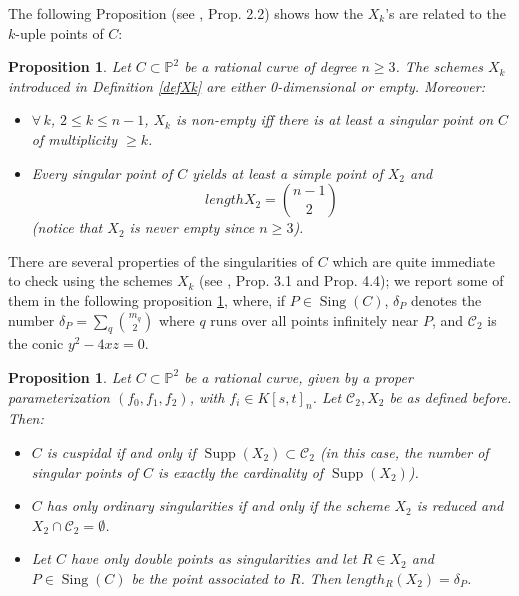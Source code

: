 \documentclass[draft]{amsart}
\newtheorem{prop}[thm]{Proposition}
\theoremstyle{definition}
\theoremstyle{remark}
\theoremstyle{definition}
\DeclareMathOperator{\Supp}{Supp}
\DeclareMathOperator{\Sing}{Sing}
\newcommand{\PP}{\mathbb{P}}
\def\a{\bigskip \par \noindent}
\def\b{\par \noindent}
\begin{document}
\a The following Proposition (see \cite{BGI}, Prop. 2.2) shows how the $X_k$'s are related to the $k$-uple points of $C$:

\begin{prop}\label{Singpoint}
Let $C\subset \PP^2$ be a rational curve of degree $n\geq 3$. The schemes $X_k$ introduced in Definition \ref{defXk} are either 0-dimensional or empty. Moreover:
\begin{itemize}
\item $\forall \, k$, $2\leq k\leq n-1$, $X_k$ is non-empty iff there is at least a singular point on $C$ of multiplicity $\geq k$.

\item  Every singular point of $C$ yields at least a simple point of $X_2$ and $$length X_2 =  {n-1\choose 2}$$ (notice that $X_2$ is never empty since $n\geq 3$).
\end{itemize}
\end{prop}

\b There are several properties of the singularities of $C$ which are quite immediate to check using the schemes $X_k$ (see \cite{BGI}, Prop. 3.1 and Prop. 4.4); we report some of them in the following proposition \ref{Singpoint2}, where, if $P\in \Sing(C)$, $\delta_P$ denotes the number 
$\delta_P = \sum_q {m_q\choose 2}$  where $q$ runs over all points infinitely near $P$, and $\mathcal{C}_2$ is the conic $y^2-4xz=0$. 
\begin{prop}\label{Singpoint2}
 Let $C\subset \PP^2$ be a rational curve, given by a proper parameterization $(f_0,f_1,f_2)$, with $f_i\in K[s,t]_n$. Let  $\mathcal{C}_2, X_2$ be as defined before. Then:

\begin{itemize}
\item $C$ is cuspidal if and only if $\Supp(X_2) \subset \mathcal{C}_2$ (in this case, the number of singular points of $C$ is exactly the cardinality of $\Supp(X_2)$).

\item $C$ has only ordinary singularities if and only if the scheme $X_2$ is reduced and $X_2\cap \mathcal{C}_2 = \emptyset$.

\item  Let $C$ have only double points as singularities and let $R\in X_2$ and $P\in \Sing(C)$ be the point associated to $R$. Then $length_R(X_2) = \delta_P$.
\end{itemize}

\end{prop}
\end{document}
